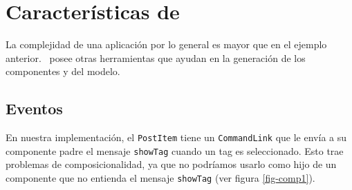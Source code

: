 \section{Características de \PITS}

La complejidad de una aplicación por lo general es mayor que en el ejemplo anterior. \PWB\ posee otras herramientas que ayudan en la generación de los componentes y del modelo.




\subsection{Eventos}
\label{sub-events}

En nuestra implementación, el \verb"PostItem" tiene un \verb"CommandLink" que le envía a su componente padre el mensaje \verb"showTag" cuando un tag es seleccionado. Esto trae problemas de composicionalidad, ya que no podríamos usarlo como hijo de un componente que no entienda el mensaje \verb"showTag" (ver figura \ref{fig-comp1}).

